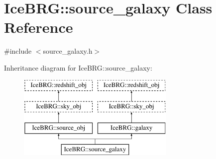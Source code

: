 \hypertarget{classIceBRG_1_1source__galaxy}{}\section{Ice\+B\+R\+G\+:\+:source\+\_\+galaxy Class Reference}
\label{classIceBRG_1_1source__galaxy}


{\ttfamily \#include $<$source\+\_\+galaxy.\+h$>$}

Inheritance diagram for Ice\+B\+R\+G\+:\+:source\+\_\+galaxy\+:\begin{figure}[H]
\begin{center}
\leavevmode
\includegraphics[height=4.000000cm]{classIceBRG_1_1source__galaxy}
\end{center}
\end{figure}

